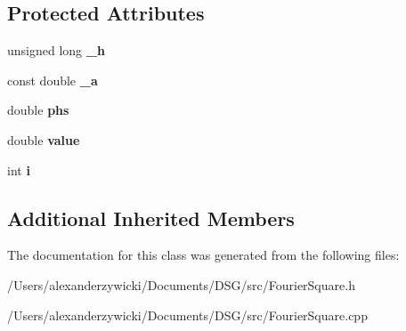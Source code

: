 \subsection*{Protected Attributes}
\begin{DoxyCompactItemize}
\item 
\hypertarget{class_d_s_g_1_1_fourier_1_1_fourier_square_ac482ccc644bac01f3491503a755b453c}{unsigned long {\bfseries \+\_\+h}}\label{class_d_s_g_1_1_fourier_1_1_fourier_square_ac482ccc644bac01f3491503a755b453c}

\item 
\hypertarget{class_d_s_g_1_1_fourier_1_1_fourier_square_a974287b077bd7bff2b028dd1af75e3d0}{const double {\bfseries \+\_\+a}}\label{class_d_s_g_1_1_fourier_1_1_fourier_square_a974287b077bd7bff2b028dd1af75e3d0}

\item 
\hypertarget{class_d_s_g_1_1_fourier_1_1_fourier_square_a6e20ab344501c18d79d594ec83f34164}{double {\bfseries phs}}\label{class_d_s_g_1_1_fourier_1_1_fourier_square_a6e20ab344501c18d79d594ec83f34164}

\item 
\hypertarget{class_d_s_g_1_1_fourier_1_1_fourier_square_a5817c7b9b793af6a76278065a67acd9c}{double {\bfseries value}}\label{class_d_s_g_1_1_fourier_1_1_fourier_square_a5817c7b9b793af6a76278065a67acd9c}

\item 
\hypertarget{class_d_s_g_1_1_fourier_1_1_fourier_square_ad52c23216a09d1933e5b3289f2d54db2}{int {\bfseries i}}\label{class_d_s_g_1_1_fourier_1_1_fourier_square_ad52c23216a09d1933e5b3289f2d54db2}

\end{DoxyCompactItemize}
\subsection*{Additional Inherited Members}


The documentation for this class was generated from the following files\+:\begin{DoxyCompactItemize}
\item 
/\+Users/alexanderzywicki/\+Documents/\+D\+S\+G/src/Fourier\+Square.\+h\item 
/\+Users/alexanderzywicki/\+Documents/\+D\+S\+G/src/Fourier\+Square.\+cpp\end{DoxyCompactItemize}
